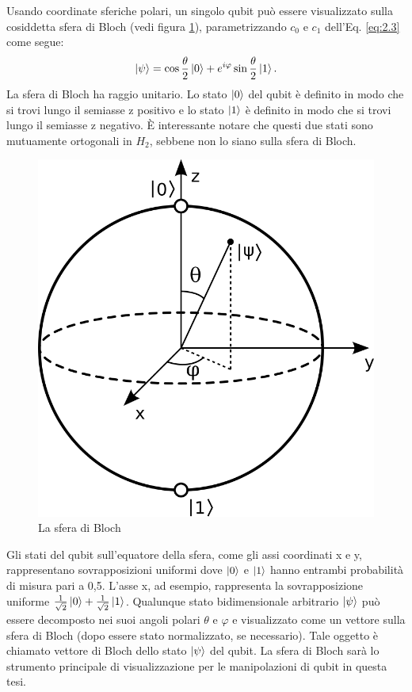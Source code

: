 Usando coordinate sferiche polari, un singolo qubit può essere visualizzato sulla cosiddetta sfera 
di Bloch (vedi figura \ref{fig:bloch}), parametrizzando $c_0$ e $c_1$ dell'Eq. \ref{eq:2.3} come segue: 
\begin{equation}
    \ket{\psi} = \cos\frac{\theta}{2}\ket{0} + e^{i\varphi}\sin\frac{\theta}{2}\ket{1}.
\end{equation}
La sfera di Bloch ha raggio unitario. 
Lo stato $\ket{0}$ del qubit è definito in modo che si trovi lungo il semiasse z positivo e lo 
stato $\ket{1}$ è definito in modo che si trovi lungo il semiasse z negativo.
È interessante notare che questi due stati sono mutuamente ortogonali in $H_2$, 
sebbene non lo siano sulla sfera di Bloch. 

\begin{figure}[h]
    \centering
    \includegraphics[width=\linewidth]{gfx/Bloch_sphere}
    \caption{La sfera di Bloch}
    \label{fig:bloch}
\end{figure}

Gli stati del qubit sull'equatore della sfera, come gli assi coordinati x e y, rappresentano 
sovrapposizioni uniformi dove $\ket{0}$ e $\ket{1}$ hanno entrambi probabilità di misura pari a 
0,5. L'asse x, ad esempio, rappresenta la sovrapposizione uniforme $\frac{1}{\sqrt{2}}
\ket{0} + \frac{1}{\sqrt{2}}\ket{1}$. 
Qualunque stato bidimensionale arbitrario $\ket{\psi}$ può essere decomposto nei suoi angoli 
polari $\theta$ e $\varphi$ e visualizzato come un vettore sulla sfera di Bloch (dopo essere 
stato normalizzato, se necessario). Tale oggetto è chiamato vettore di Bloch dello stato 
$\ket{\psi}$ del qubit. La sfera di Bloch sarà lo strumento principale di visualizzazione per le 
manipolazioni di qubit in questa tesi. 

